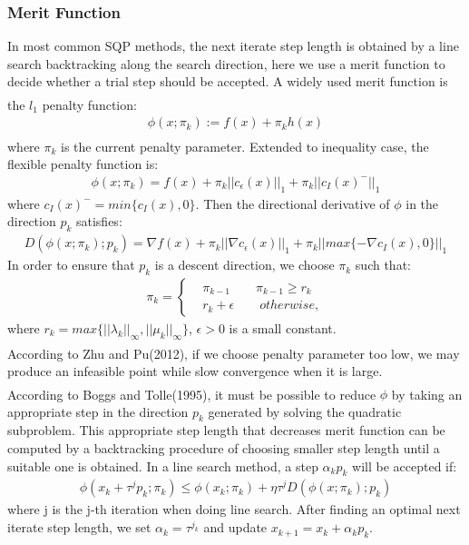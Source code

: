 \documentclass{article}
\newcommand{\upcite}[1]{\textsuperscript{\textsuperscript{\cite{#1}}}}
\begin{document}
\begin{spacing}{1.5}
\subsubsection{Merit Function}
In most common SQP methods, the next iterate step length is obtained by a line search backtracking along the search direction, here we use a merit function to decide whether a trial step should be accepted. A widely used merit function is the $l_1$ penalty function\upcite{Ref8}:
\begin{align}
\phi(x;\pi_k):=f(x)+\pi_kh(x)
\end{align}
where $\pi_k$ is the current penalty parameter. Extended to inequality case\upcite{Ref9}, the flexible penalty function is:
\begin{align}
\phi(x;\pi_k)=f(x)+\pi_k||c_\epsilon(x)||_1+\pi_k||c_I(x)^-||_1
\end{align}
where $c_I(x)^-=min\{c_I(x),0\}$. 
Then the directional derivative of $\phi$ in the direction $p_k$ satisfies:
\begin{align}
D(\phi(x;\pi_k); p_k)=\nabla f(x)+\pi_k||\nabla c_\epsilon(x)||_1+\pi_k||max\{-\nabla c_I(x),0\}||_1
\end{align}
In order to ensure that $p_k$ is a descent direction, we choose $\pi_k$ such that:
\begin{align}
\pi_k=\left\{
\begin{aligned}
& \pi_{k-1}\qquad \pi_{k-1}\ge r_k\\
&r_k+\epsilon \qquad otherwise,
\end{aligned}
\right.
\end{align}
where $r_k=max\{||\lambda_k||_\infty, ||\mu_k||_\infty\}$, $\epsilon>0$ is a small constant.\\
According to Zhu and Pu(2012)\upcite{Ref8}, if we choose penalty parameter too low, we may produce an infeasible point while slow convergence when it is large.\\
According to Boggs and Tolle(1995)\upcite{1}, it must be possible to reduce $\phi$ by taking an appropriate step in the direction $p_k$ generated by solving the quadratic subproblem. This appropriate step length that decreases merit function can be computed by a backtracking procedure of choosing smaller step length until a suitable one is obtained.
In a line search method, a step $\alpha_kp_k$ will be accepted if:
\begin{align}
\phi(x_k+\tau^jp_k; \pi_k)\le\phi(x_k; \pi_k)+\eta\tau^jD(\phi(x;\pi_k);p_k)
\end{align}
where j is the j-th iteration when doing line search. After finding an optimal next iterate step length, we set $\alpha_k=\tau^{j_k}$ and update $x_{k+1}=x_k+\alpha_kp_k$.


\end{spacing}
\end{document}
